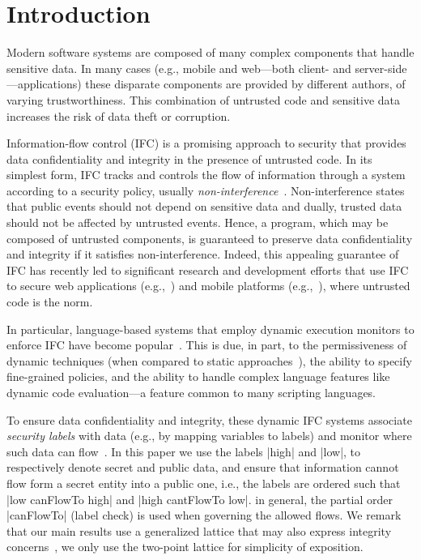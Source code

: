 \section{Introduction}
\label{sec:intro}

Modern software systems are composed of many complex components that
handle sensitive data.
%
In many cases (e.g., mobile and web---both client- and
server-side---applications) these disparate components are provided
by different authors, of varying trustworthiness.
%
This combination of untrusted code and sensitive data 
increases the risk of data theft or corruption.

Information-flow control (IFC) is a promising approach to security
that provides data confidentiality and integrity in the presence of
untrusted code.
%
In its simplest form, IFC tracks and controls the flow of information
through a system according to a security policy, usually
\emph{non-interference}~\cite{Goguen:Meseguer:Noninterference}.
%
Non-interference states that public events should not depend on
sensitive data and dually, trusted data should not be affected by
untrusted events.
%
Hence, a program, which may be composed of untrusted components, is
guaranteed to preserve data confidentiality and integrity if it
satisfies non-interference.
%
Indeed, this appealing guarantee of IFC has recently led to significant
research and development efforts that use IFC to secure web
applications (e.g.,~\cite{DeGroef:2012:FWB:2382196.2382275,
giffin:hails, yang:2013:towards, Hedin13}) and mobile platforms
(e.g.,~\cite{Enck:2010,android:esorics13}), where untrusted code is
the norm.

In particular, language-based systems that employ dynamic execution
monitors to enforce IFC have become popular~\cite{Hedin2011}.
%
This is due, in part, to the permissiveness of dynamic techniques
(when compared to static approaches~\cite{Sabelfeld:Russo:PSI09}), the
ability to specify fine-grained policies, and the ability to handle
complex language features like dynamic code evaluation---a feature
common to many scripting languages.
 
To ensure data confidentiality and integrity, these dynamic IFC
systems associate \emph{security labels} with data (e.g., by mapping
variables to labels) and monitor where such data can
flow~\cite{myers:dlm, Stefan:2011}.  
%
In this paper we use the labels |high| and |low|, to respectively
denote secret and public data, and ensure that information cannot flow
form a secret entity into a public one, i.e., the labels are ordered
such that |low canFlowTo high| and |high cantFlowTo low|.
%
in general, the partial order |canFlowTo| (label check) is used when
governing the allowed flows.
%
We remark that our main results use a generalized lattice that may
 also express integrity concerns~\cite{myers:dlm, Stefan:2011}, we
 only use the two-point lattice for simplicity of exposition.
 
